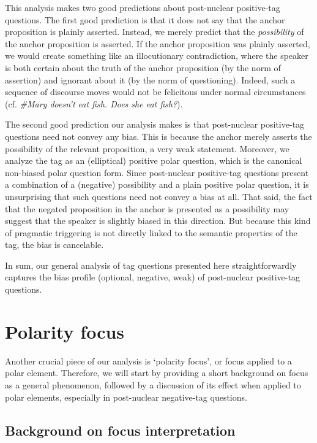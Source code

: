 \documentclass[output=paper,colorlinks,citecolor=brown]{langscibook}
\begin{document}
This analysis makes two good predictions about  post-nuclear positive-tag questions. The first good prediction is that it does not say that the anchor proposition is plainly asserted. Instead, we merely predict that the \textit{possibility} of the anchor proposition is asserted. If the anchor proposition was plainly asserted, we would create something like an illocutionary contradiction, where the speaker is both certain about the truth of the anchor proposition (by the norm of assertion) and ignorant about it (by the norm of questioning). Indeed, such a sequence of discourse moves would not be felicitous under normal circumstances (cf. \textit{\#Mary doesn't eat fish. Does she eat fish?}). 

The second good prediction our analysis makes is that  post-nuclear positive-tag questions need not convey any bias. This is because the anchor merely asserts the possibility of the relevant proposition, a very weak statement. Moreover, we analyze the tag as an (elliptical) positive polar question, which is the canonical non-biased polar question form. Since post-nuclear positive-tag questions present a combination of a (negative) possibility and a plain positive polar question, it is unsurprising that such questions need not convey a bias at all. That said, the fact that the negated proposition in the anchor is presented as a possibility may suggest that the speaker is slightly biased in this direction. But because this kind of pragmatic triggering is not directly linked to the semantic properties of the tag, the bias is cancelable. 

In sum, our general analysis of tag questions presented here straightforwardly captures the bias profile (optional, negative, weak) of  post-nuclear positive-tag questions.

\section{Polarity focus}\label{Sect3}

Another crucial piece of our analysis is `polarity focus', or focus applied to a polar element. Therefore, we will start by providing a short background on focus as a general phenomenon, followed by a discussion of its effect when applied to polar elements, especially in post-nuclear negative-tag questions.  

\subsection{Background on focus interpretation}\label{Back.Foc}
\end{document}
